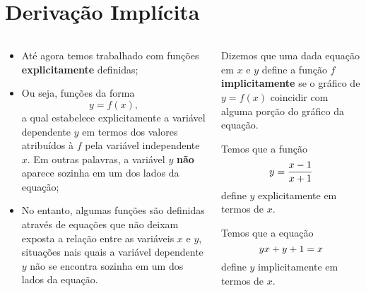 \section{Derivação Implícita}

\begin{frame}
  \begin{columns}[onlytextwidth]
    \begin{column}{0.49\textwidth}\vspace*{-0.5cm}\small
      \begin{itemize}
        \item Até agora temos trabalhado com funções \textbf{explicitamente} definidas;
        \item Ou seja, funções da forma
        \begin{equation*}
          y = f(x),
        \end{equation*}
        a qual estabelece explicitamente a variável dependente $y$ em termos dos valores atribuídos à $f$ pela variável independente $x$. Em outras palavras, a variável $y$ \textbf{não} aparece sozinha em um dos lados da equação;
        \item No entanto, algumas funções são definidas através de equações que não deixam exposta a relação entre as variáveis $x$ e $y$, situações nais quais a variável dependente $y$ não se encontra sozinha em um dos lados da equação.
      \end{itemize}
    \end{column}
    \begin{column}{0.49\textwidth}\vspace*{-0.5cm}
      \begin{definition}
        Dizemos que uma dada equação em $x$ e $y$ define a função $f$ \textbf{implicitamente} se o gráfico de $y=f(x)$ coincidir com alguma porção do gráfico da equação.
      \end{definition}
      \begin{example-highlight}
        Temos que a função\vspace*{-0.2cm}
        \begin{equation*}
          y = \frac{x-1}{x+1}\vspace*{-0.2cm}
        \end{equation*}
        define $y$ explicitamente em termos de $x$.
      \end{example-highlight}
      \begin{example-highlight}
        Temos que a equação\vspace*{-0.2cm}
        \begin{equation*}
          yx + y + 1 = x\vspace*{-0.2cm}
        \end{equation*}
        define $y$ implicitamente em termos de $x$.
      \end{example-highlight}
    \end{column}
  \end{columns}
\end{frame}

